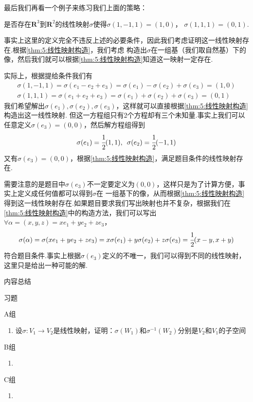 最后我们再看一个例子来练习我们上面的策略：
\begin{example}\label{ex:5:线性映射判断2}
    是否存在$\mathbf{R}^3$到$\mathbf{R}^2$的线性映射$\sigma$使得$\sigma(1,-1,1)=(1,0)$，
	$\sigma(1,1,1)=(0,1)$.
\end{example}
\begin{solution}
    事实上这里的定义完全不违反上述的必要条件，因此我们考虑证明这一线性映射存在.根据\autoref{thm:5:线性映射构造}，我们考虑
    构造出$\sigma$在一组基（我们取自然基）下的像，然后我们就可以根据\autoref{thm:5:线性映射构造}知道这一映射一定存在.

    实际上，根据提给条件我们有
    \begin{gather*}
        \sigma(1,-1,1)=\sigma(e_1-e_2+e_3)=\sigma(e_1)-\sigma(e_2)+\sigma(e_3)=(1,0) \\
        \sigma(1,1,1)=\sigma(e_1+e_2+e_3)=\sigma(e_1)+\sigma(e_2)+\sigma(e_3)=(0,1)
    \end{gather*}
    我们希望解出$\sigma(e_1),\sigma(e_2),\sigma(e_3)$，这样就可以直接根据\autoref{thm:5:线性映射构造}构造出这一线性映射.
    但这一方程组只有2个方程却有三个未知量.事实上我们可以任意定义$\sigma(e_3)=(0,0)$，然后解方程组得到
    \[\sigma(e_1)=\cfrac{1}{2}(1,1),\enspace \sigma(e_2)=\cfrac{1}{2}(-1,1)\]
    又有$\sigma(e_3)=(0,0)$，根据\autoref{thm:5:线性映射构造}，满足题目条件的线性映射存在.
\end{solution}
需要注意的是题目中$\sigma(e_3)$不一定要定义为$(0,0)$，这样只是为了计算方便，事实上定义成任何值都可以得到$\sigma$在
一组基下的像，从而根据\autoref{thm:5:线性映射构造}得到这一线性映射存在.如果题目要求我们写出映射也并不复杂，根据我们在
\autoref{thm:5:线性映射构造}中的构造方法，我们可以写出$\forall\alpha=(x,y,z)=xe_1+ye_2+ze_3$，
\[\sigma(\alpha)=\sigma(xe_1+ye_2+ze_3)=x\sigma(e_1)+y\sigma(e_2)+z\sigma(e_3)=\cfrac{1}{2}(x-y,x+y)\]
符合题目条件.事实上根据$\sigma(e_3)$定义的不唯一，我们可以得到不同的线性映射，这里只是给出一种可能的解.

\vspace{2ex}
\centerline{\heiti \Large 内容总结}

\vspace{2ex}

\centerline{\heiti \Large 习题}
\vspace{2ex}
{\kaishu }
\begin{flushright}
    \kaishu

\end{flushright}
\centerline{\heiti A组}
\begin{enumerate}
    \item 设$\sigma: V_1\to V_2$是线性映射，证明：$\sigma(W_1)$和$\sigma^{-1}(W_2)$分别是$V_2$和$V_1$的子空间
\end{enumerate}
\centerline{\heiti B组}
\begin{enumerate}
    \item
\end{enumerate}
\centerline{\heiti C组}
\begin{enumerate}
    \item
\end{enumerate}
